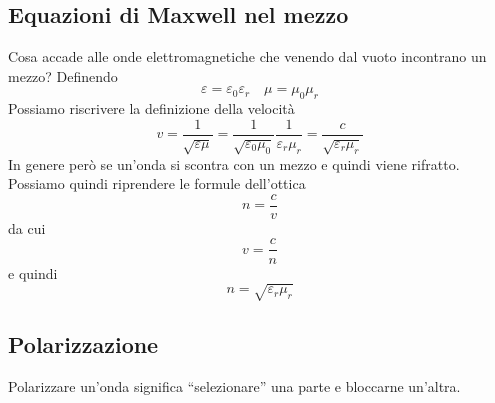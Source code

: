\subsection{Equazioni di Maxwell nel mezzo}
Cosa accade alle onde elettromagnetiche che venendo dal vuoto incontrano un mezzo? Definendo
\begin{equation*}
  \varepsilon = \varepsilon_0\varepsilon_r \quad \mu=\mu_0\mu_r
\end{equation*}
Possiamo riscrivere la definizione della velocità
\begin{equation*}
  v = \frac{1}{\sqrt{\varepsilon\mu}} = 
  \frac{1}{\sqrt{\varepsilon_0\mu_0}}\frac{1}{\varepsilon_r\mu_r} =
  \frac{c}{\sqrt{\varepsilon_r\mu_r}}
\end{equation*}
In genere però se un'onda si scontra con un mezzo e quindi viene rifratto. Possiamo quindi 
riprendere le formule dell'ottica
\begin{equation*}
  n = \frac{c}{v}
\end{equation*}
da cui
\begin{equation*}
  v = \frac{c}{n}
\end{equation*}
e quindi
\begin{equation*}
  n = \sqrt{\varepsilon_r\mu_r} 
\end{equation*}
\subsection{Polarizzazione}
Polarizzare un'onda significa ``selezionare'' una parte e bloccarne un'altra.
